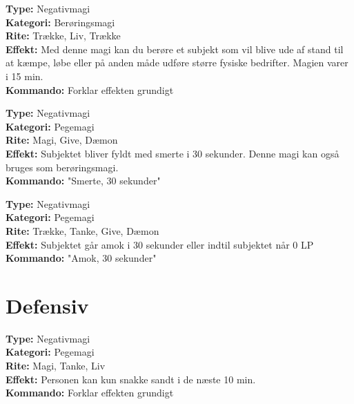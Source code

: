 \begin{offensiv*}[Svaghed]
\textbf{Type:} Negativmagi\\
\textbf{Kategori:} Berøringsmagi\\ 
\textbf{Rite:} Trække, Liv, Trække\\
\textbf{Effekt:} Med denne magi kan du berøre et subjekt som vil blive ude af stand til at kæmpe, løbe eller på anden måde udføre større fysiske bedrifter. Magien varer i 15 min.\\
\textbf{Kommando:} Forklar effekten grundigt
\end{offensiv*}

\begin{offensiv*}[Smerte]
\textbf{Type:} Negativmagi\\
\textbf{Kategori:} Pegemagi\\
\textbf{Rite:} Magi, Give, Dæmon\\
\textbf{Effekt:} Subjektet bliver fyldt med smerte i 30 sekunder. Denne magi kan også bruges som berøringsmagi.\\
\textbf{Kommando:} "Smerte, 30 sekunder"
\end{offensiv*}

\begin{offensiv*}[Amok]
\textbf{Type:} Negativmagi\\
\textbf{Kategori:} Pegemagi\\
\textbf{Rite:} Trække, Tanke, Give, Dæmon\\
\textbf{Effekt:} Subjektet går amok i 30 sekunder eller indtil subjektet når 0 LP\\
\textbf{Kommando:} "Amok, 30 sekunder"\\
\end{offensiv*}

\section*{Defensiv}

\begin{defensiv*}[Sandhed]
\textbf{Type:} Negativmagi\\
\textbf{Kategori:} Pegemagi\\
\textbf{Rite:} Magi, Tanke, Liv\\
\textbf{Effekt:} Personen kan kun snakke sandt i de næste 10 min.\\
\textbf{Kommando:} Forklar effekten grundigt\\
\end{defensiv*}

